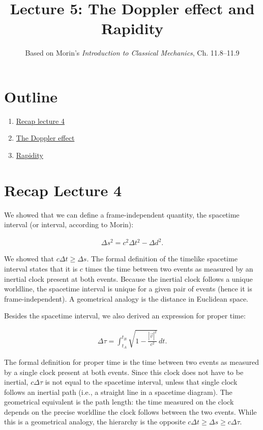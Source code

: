 \documentclass[12pt]{article}
\title{\textbf{Lecture 5: The Doppler effect and Rapidity}}
\author{Based on Morin's \textit{Introduction to Classical Mechanics}, Ch. 11.8--11.9}
\date{}
\newcommand{\be}{\begin{eqnarray}}
\newcommand{\ee}{\end{eqnarray}}
\begin{document}
\maketitle

\section*{Outline}
\begin{enumerate}
    \item \href{sec:recap}{Recap lecture 4}
    \item \href{sec:DE}{The Doppler effect}
    \item \href{sec:Rap}{Rapidity}
\end{enumerate}

\section{Recap Lecture 4}\label{sec:recap}
We showed that we can define a frame-independent quantity, the spacetime interval (or interval, according to Morin):
\begin{tcolorbox}[colback=blue!5!white]
\vspace{-1.3em}
\be
\Delta s^2  = c^2 \Delta t^2 - \Delta d^2 \label{eq:SI}.
\ee
\end{tcolorbox}
We showed that $c\Delta t \geq \Delta s$. The formal definition of the timelike spacetime interval states that it is $c$ times the time between two events as measured by an inertial clock present at both events. Because the inertial clock follows a unique worldline, the spacetime interval is unique for a given pair of events (hence it is frame-independent). A geometrical analogy is the distance in Euclidean space.

Besides the spacetime interval, we also derived an expression for proper time:
\begin{tcolorbox}[colback=blue!5!white]
\vspace{-1.3em}
\be
\Delta \tau = \int_{t_A}^{t_B} \sqrt{1-\frac{|\vec{v}|^2}{c^2}}\,dt.
\ee
\end{tcolorbox}
The formal definition for proper time is the time between two events as measured by a single clock present at both events. Since this clock does not have to be inertial, $c\Delta\tau$ is not equal to the spacetime interval, unless that single clock follows an inertial path (i.e., a straight line in a spacetime diagram). The geometrical equivalent is the path length: the time measured on the clock depends on the precise worldline the clock follows between the two events. While this is a geometrical analogy, the hierarchy is the opposite $c\Delta t\geq \Delta s \geq c\Delta \tau$.
\end{document}

